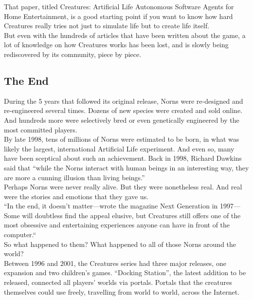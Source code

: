 \documentclass[11pt,twoside,a4paper]{article}
\begin{document}
That paper, titled Creatures: Artificial Life Autonomous Software Agents for Home Entertainment, is a good starting point if you want to know how hard Creatures really tries not just to simulate life but to create life itself.~\\

But even with the hundreds of articles that have been written about the game, a lot of knowledge on how Creatures works has been lost, and is slowly being rediscovered by its community, piece by piece.~\\

\subsection*{The End}

During the 5 years that followed its original release, Norns were re-designed and re-engineered several times. Dozens of new species were created and sold online. And hundreds more were selectively bred or even genetically engineered by the most committed players.~\\

By late 1998, tens of millions of Norns were estimated to be born, in what was likely the largest, international Artificial Life experiment. And even so, many have been sceptical about such an achievement. Back in 1998, Richard Dawkins said that “while the Norns interact with human beings in an interesting way, they are more a cunning illusion than living beings.”~\\

Perhaps Norns were never really alive. But they were nonetheless real. And real were the stories and emotions that they gave us.~\\

“In the end, it doesn’t matter—wrote the magazine Next Generation in 1997—Some will doubtless find the appeal elusive, but Creatures still offers one of the most obsessive and entertaining experiences anyone can have in front of the computer.“~\\

So what happened to them? What happened to all of those Norns around the world?~\\

Between 1996 and 2001, the Creatures series had three major releases, one expansion and two children’s games. “Docking Station”, the latest addition to be released, connected all players’ worlds via portals. Portals that the creatures themselves could use freely, travelling from world to world, across the Internet.~\\
\end{document}
